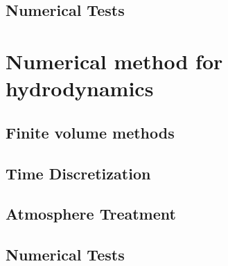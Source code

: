 \subsection{Numerical Tests} %
\label{section3.1.7}

\section{Numerical method for hydrodynamics} %
\label{section3.2}

\subsection{Finite volume methods} %
\label{section3.2.1}

\subsection{Time Discretization} %
\label{section3.2.2}

\subsection{Atmosphere Treatment} %
\label{section3.2.3}

\subsection{Numerical Tests} %
\label{section3.2.4}

